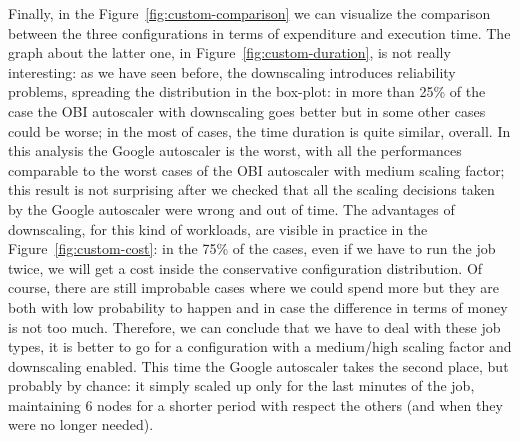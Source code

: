 \documentclass[12pt,twoside,cucitura]{toptesi}
\begin{document}
Finally, in the Figure~\ref{fig:custom-comparison} we can visualize the comparison between the three configurations in terms of expenditure and execution time. The graph about the latter one, in Figure~\ref{fig:custom-duration}, is not really interesting: as we have seen before, the downscaling introduces reliability problems, spreading the distribution in the box-plot: in more than 25\% of the case the OBI autoscaler with downscaling goes better but in some other cases could be worse; in the most of cases, the time duration is quite similar, overall. In this analysis the Google autoscaler is the worst, with all the performances comparable to the worst cases of the OBI autoscaler with medium scaling factor; this result is not surprising after we checked that all the scaling decisions taken by the Google autoscaler were wrong and out of time. The advantages of downscaling, for this kind of workloads, are visible in practice in the Figure~\ref{fig:custom-cost}: in the 75\% of the cases, even if we have to run the job twice, we will get a cost inside the conservative configuration distribution. Of course, there are still improbable cases where we could spend more but they are both with low probability to happen and in case the difference in terms of money is not too much. Therefore, we can conclude that we have to deal with these job types, it is better to go for a configuration with a medium/high scaling factor and downscaling enabled. This time the Google autoscaler takes the second place, but probably by chance: it simply scaled up only for the last minutes of the job, maintaining 6 nodes for a shorter period with respect the others (and when they were no longer needed).
\end{document}
